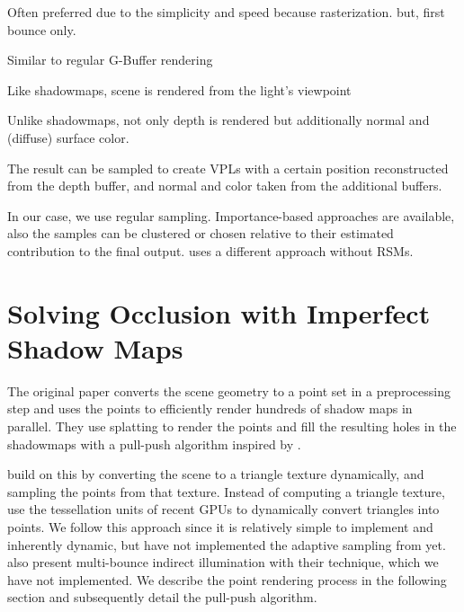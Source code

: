 \begin{outline}
\1 Often preferred due to the simplicity and speed because rasterization. but, first bounce only.

\1 Similar to regular G-Buffer rendering

\1 Like shadowmaps, scene is rendered from the light's viewpoint

\1 Unlike shadowmaps, not only depth is rendered but additionally normal and (diffuse) surface color.

\1 The result can be sampled to create VPLs with a certain position reconstructed from the depth buffer, and normal and color taken from the additional buffers.

\1 In our case, we use regular sampling. Importance-based approaches are available, also the samples can be clustered \cite{} or chosen relative to their estimated contribution to the final output. \citet{hedman2016sequential} uses a different approach without RSMs.

\end{outline}

\section{Solving Occlusion with Imperfect Shadow Maps}
\label{sec:ISM}


The original paper \citep{ritschel2008ism} converts the scene geometry to a point set in a preprocessing step and uses the points to efficiently render hundreds of shadow maps in parallel. They use splatting to render the points and fill the resulting holes in the shadowmaps with a pull-push algorithm inspired by \citep{Marroquim:2007:reconstruction}.

\citet{ritschel2011ismsViewAdaptive} build on \citet{laine2007incremental} this by converting the scene to a triangle texture dynamically, and sampling the points from that texture. Instead of computing a triangle texture, \citet{barak2013temporally} use the tessellation units of recent GPUs to dynamically convert triangles into points.
We follow this approach since it is relatively simple to implement and inherently dynamic, but have not implemented the adaptive sampling from \citet{ritschel2011ismsViewAdaptive} yet.
\citep{ritschel2008ism} also present multi-bounce indirect illumination with their technique, which we have not implemented.
We describe the point rendering process in the following section and subsequently detail the pull-push algorithm.


